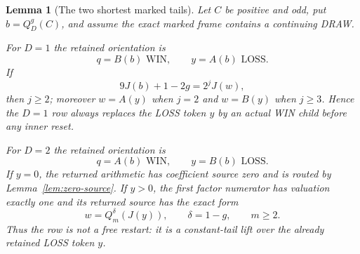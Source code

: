 \documentclass[11pt]{article}
\newtheorem{lemma}[theorem]{Lemma}
\begin{document}
\begin{lemma}[The two shortest marked tails]
\label{lem:short-tail}
Let $C$ be positive and odd, put $b=Q_D^g(C)$, and assume the exact marked
frame contains a continuing DRAW.

For $D=1$ the retained orientation is
\[
 q=B(b)\text{ WIN},\qquad y=A(b)\text{ LOSS}.
\]
If
\[
 9J(b)+1-2g=2^jJ(w),
\]
then $j\ge2$; moreover $w=A(y)$ when $j=2$ and $w=B(y)$ when
$j\ge3$. Hence the $D=1$ row always replaces the LOSS token $y$ by an
actual WIN child before any inner reset.

For $D=2$ the retained orientation is
\[
 q=A(b)\text{ WIN},\qquad y=B(b)\text{ LOSS}.
\]
If $y=0$, the returned arithmetic has coefficient source zero and is routed
by Lemma~\ref{lem:zero-source}.  If $y>0$, the first factor numerator has
valuation exactly one and its returned source has the exact form
\[
 w=Q_m^\delta(J(y)),\qquad \delta=1-g,\qquad m\ge2.
\]
Thus the row is not a free restart: it is a constant-tail lift over the
already retained LOSS token $y$.
\end{lemma}
\end{document}
